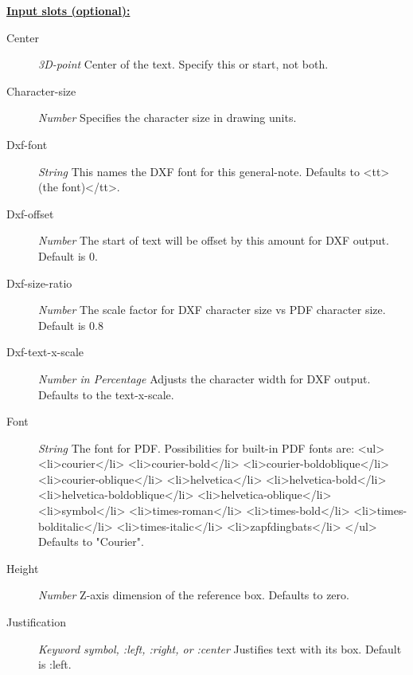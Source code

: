 \documentclass [11pt]{book}
\begin{document}
\begin{itemize}
\begin{description}
\end{description}








\textbf{
\underline{Input slots (optional):}}

\begin{description}

\item [Center]
\emph{3D-point} Center of the text. Specify this or start, not both.


\item [Character-size]
\emph{Number} Specifies the character size in drawing units.


\item [Dxf-font]
\emph{String} This names the DXF font for this general-note. Defaults to <tt>(the font)</tt>.


\item [Dxf-offset]
\emph{Number} The start of text will be offset by this amount for DXF output. Default is 0.


\item [Dxf-size-ratio]
\emph{Number} The scale factor for DXF character size vs PDF character size. Default is 0.8


\item [Dxf-text-x-scale]
\emph{Number in Percentage} Adjusts the character width for DXF output. Defaults to the text-x-scale.


\item [Font]
\emph{String} The font for PDF. Possibilities for built-in PDF fonts are:
<ul>
<li>courier</li>
<li>courier-bold</li>
<li>courier-boldoblique</li>
<li>courier-oblique</li>
<li>helvetica</li>
<li>helvetica-bold</li>
<li>helvetica-boldoblique</li>
<li>helvetica-oblique</li>
<li>symbol</li>
<li>times-roman</li>
<li>times-bold</li>
<li>times-bolditalic</li>
<li>times-italic</li>
<li>zapfdingbats</li>
</ul>
Defaults to "Courier".


\item [Height]
\emph{Number} Z-axis dimension of the reference box. Defaults to zero.


\item [Justification]
\emph{Keyword symbol, :left, :right, or :center} Justifies text with its box. Default is :left.



\end{description}
\end{itemize}
\end{document}
